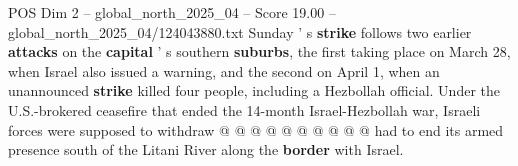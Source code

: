 \begin{textsample}{POS Dim 2 – global\_north\_2025\_04 – Score 19.00 – global\_north\_2025\_04/124043880.txt}
Sunday ' s \textbf{strike} follows two earlier \textbf{attacks} on the \textbf{capital} ' s southern \textbf{suburbs}, the first taking place on March 28, when Israel also issued a warning, and the second on April 1, when an unannounced \textbf{strike} killed four people, including a Hezbollah official.
Under the U.S.-brokered ceasefire that ended the 14-month Israel-Hezbollah war, Israeli forces were supposed to withdraw @ @ @ @ @ @ @ @ @ @ had to end its armed presence south of the Litani River along the \textbf{border} with Israel.

\end{textsample}
